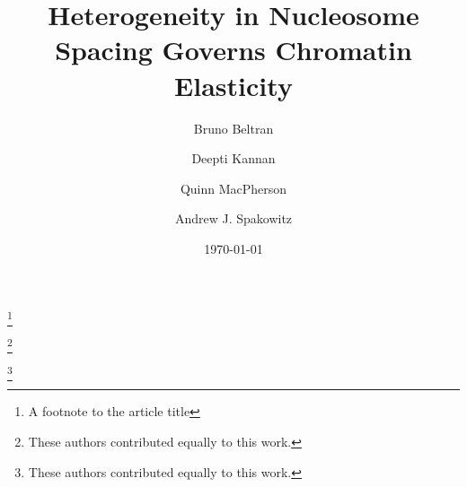 \documentclass[%
 reprint,
superscriptaddress,
showpacs,preprintnumbers,
 amsmath,amssymb,
 aps,
 prl,
]{revtex4-1}
\begin{document}
\title{Heterogeneity in Nucleosome Spacing Governs Chromatin Elasticity}%
\thanks{A footnote to the article title}%

\author{Bruno Beltran}
\thanks{These authors contributed equally to this work.}%
%
\author{Deepti Kannan}%
\thanks{These authors contributed equally to this work.}%
\author{Quinn MacPherson}%
%
\author{Andrew J. Spakowitz}%
%
%
\date{\today}%
\end{document}
